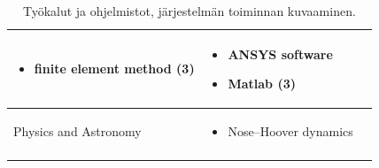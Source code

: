 \documentclass[utf8]{gradu3}
\begin{document}
\begin{longtable}[h]{|p{4cm}|p{5cm}|p{5cm}|}
\begin{itemize}
        \item finite element method (3)
    \end{itemize} &
    \begin{itemize}
        \item ANSYS software
        \item Matlab (3)
    \end{itemize}
    \\
    \hline
    Physics and Astronomy & \begin{itemize}
        \item Nose–Hoover dynamics
    \end{itemize} &
    
    \\
    \hline
    \caption{Työkalut ja ohjelmistot, järjestelmän toiminnan kuvaaminen.}
    \label{table:mallintaminen 1.}
\end{longtable}

\pagebreak
\end{document}
